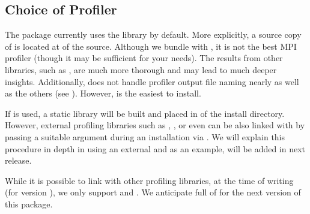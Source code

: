 \subsection{Choice of Profiler}

The  package currently uses the  library by default.  
More explicitly, a source copy of  is located at 
 of the  source. Although we bundle  with , it is not the best MPI profiler (though it may be sufficient for your needs).  The results from other libraries, such as , are much more thorough and may lead to much deeper insights.  Additionally,  does not handle profiler output file naming nearly as well as the others (see ).  However,  is the easiest to install. 

If  is used, a
static library will be built and placed in 
of the  install directory.  However, external profiling 
libraries such as , , or even   can be also 
linked with  by passing a suitable  
argument during an installation via . We will explain this 
procedure in depth in  using an external  and 
as an example,  will be added in next release.

While it is possible to link with other profiling libraries, at the time of 
writing (for version \profversion), we only support  and .  We anticipate full 
of  for the next version of this package.
